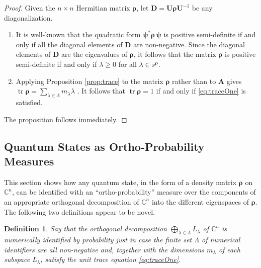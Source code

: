 \documentclass[11pt]{article}
\newcommand \C { \mathbb{C} }
\DeclareMathOperator{\tr}{tr}
\newtheorem{definition}[theorem]{Definition}
\begin{document}
\begin{proof}
	Given the $n \times n$ Hermitian matrix $ \boldsymbol \rho $, 
	let $ \mathbf D = \mathbf U \boldsymbol \rho \mathbf U^{-1} $ be any diagonalization.
\begin{enumerate}
	\item It is well-known that the quadratic form
 \( \boldsymbol \psi ^* \boldsymbol \rho \, \boldsymbol \psi \) 
 	is positive semi-definite if and only if all the diagonal elements of $ \mathbf D$ 
	are non-negative.
	Since the diagonal elements of $ \mathbf D$ are the eigenvalues of $ \boldsymbol \rho $,
	it follows that the matrix $ \boldsymbol \rho $ is positive semi-definite
	if and only if $ \lambda \ge 0$ for all $ \lambda \in s^{ \boldsymbol \rho }$.
	\item Applying Proposition \ref{prop:trace} to the matrix $ \boldsymbol \rho $ 
	rather than to $ \mathbf A$ gives 
 \( \tr \boldsymbol \rho = \sum _{ \lambda \in \Lambda } m_\lambda \lambda \) .
	It follows that $ \tr \boldsymbol \rho = 1$	if and only if \eqref{eq:traceOne} is satisfied.
\end{enumerate}
	The proposition follows immediately.
\end{proof}

\subsection{Quantum States as Ortho-Probability Measures} \label{ss:orthoProbs}

This section shows how any quantum state, 
in the form of a density matrix $ \boldsymbol \rho $ on $ \C^n $, 
can be identified with an ``ortho-probability'' measure 
over the components of an appropriate orthogonal decomposition of $ \C^n $
into the different eigenspaces of $ \boldsymbol \rho $.   
The following two definitions appear to be novel.

\begin{definition} \label{def:probLabelledOrthDecomp}
	Say that the orthogonal decomposition $ \bigoplus _{ \lambda \in \Lambda } L_\lambda $ 
	of $ \C^n $	is \emph{numerically identified by probability} 
	just in case the finite set $ \Lambda $ of numerical identifiers are all non-negative
	and, together with the dimensions $ m_\lambda $ of each subspace $ L_\lambda $, 
	satisfy the unit trace equation \eqref{eq:traceOne}.
\end{definition}
\end{document}
